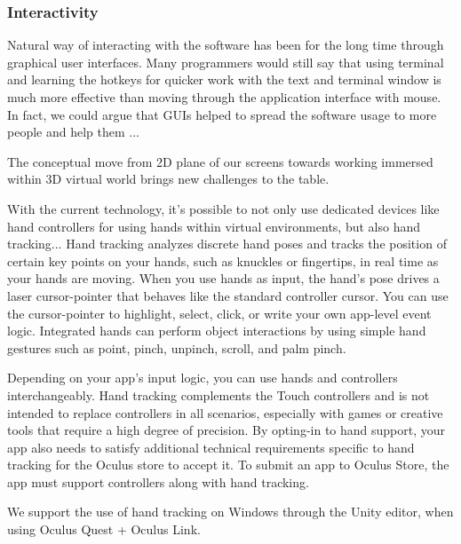 \subsubsection{Interactivity}\label{sec:interactivity}

Natural way of interacting with the software has been for the long time through graphical user interfaces. Many programmers would still say that using terminal and learning the hotkeys for quicker work with the text and terminal window is much more effective than moving through the application interface with mouse. In fact, we could argue that GUIs helped to spread the software usage to more people and help them ... 

The conceptual move from 2D plane of our screens towards working immersed within 3D virtual world brings new challenges to the table. 

With the current technology, it's possible to not only use dedicated devices like hand controllers for using hands within virtual environments, but also hand tracking... %
Hand tracking analyzes discrete hand poses and tracks the position of certain key points on your hands, such as knuckles or fingertips, in real time as your hands are moving. When you use hands as input, the hand’s pose drives a laser cursor-pointer that behaves like the standard controller cursor. You can use the cursor-pointer to highlight, select, click, or write your own app-level event logic. Integrated hands can perform object interactions by using simple hand gestures such as point, pinch, unpinch, scroll, and palm pinch.

Depending on your app’s input logic, you can use hands and controllers interchangeably. Hand tracking complements the Touch controllers and is not intended to replace controllers in all scenarios, especially with games or creative tools that require a high degree of precision. By opting-in to hand support, your app also needs to satisfy additional technical requirements specific to hand tracking for the Oculus store to accept it. To submit an app to Oculus Store, the app must support controllers along with hand tracking.

We support the use of hand tracking on Windows through the Unity editor, when using Oculus Quest + Oculus Link. 


